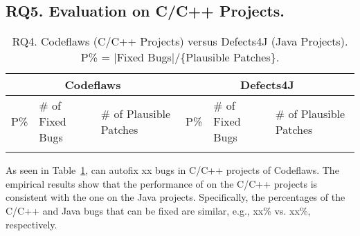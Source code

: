 \subsection{\bf RQ5. Evaluation on C/C++ Projects.}




\begin{table}[t]
	\caption{RQ4. Codeflaws (C/C++ Projects) versus Defects4J (Java Projects). P\% = $|$Fixed Bugs$|$/\{Plausible Patches\}.}
	\vspace{-5pt}
	{\small
		\begin{center}
			\tabcolsep 2.7pt
			\begin{tabular}{p{0.3cm}<{\centering}|p{1.5cm}<{\centering}|p{1.55cm}<{\centering}|p{0.3cm}<{\centering}|p{1.5cm}<{\centering}|p{1.55cm}<{\centering}}\hline	
				
				\multicolumn{3}{c|}{Codeflaws } & \multicolumn{3}{c}{Defects4J}\\\hline
				 P\%& \# of Fixed Bugs& \# of Plausible Patches &P\%& \# of Fixed Bugs & \# of Plausible Patches \\ \hline
				
				   &  &&&&\\ 
				\hline

			\end{tabular}
			\label{RQ5}
		\end{center}
	}
	\vspace{-10pt}
\end{table}


As seen in Table~\ref{RQ5}, {\tool} can autofix xx bugs in C/C++ projects of Codeflaws. 
The empirical results show that the performance of
{\tool} on the C/C++ projects is consistent with the one on the Java
projects. Specifically, the percentages of the C/C++ and Java bugs that can be fixed are similar, e.g., xx\% vs. xx\%, respectively. 